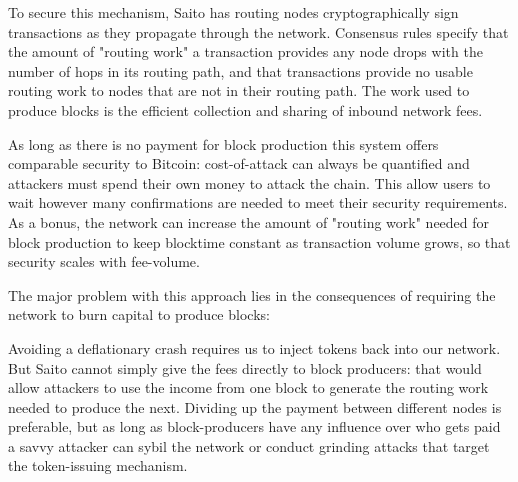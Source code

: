 \documentclass[11pt, oneside]{article}   	%
\begin{document}
\begin{multicols}{2}
To secure this mechanism, Saito has routing nodes cryptographically sign transactions as they propagate through the network. Consensus rules specify that the amount of "routing work" a transaction provides any node drops with the number of hops in its routing path, and that transactions provide no usable routing work to nodes that are not in their routing path. The work used to produce blocks is the efficient collection and sharing of inbound network fees.

As long as there is no payment for block production this system offers comparable security to Bitcoin: cost-of-attack can always be quantified and attackers must spend their own money to attack the chain. This allow users to wait however many confirmations are needed to meet their security requirements. As a bonus, the network can increase the amount of "routing work" needed for block production to keep blocktime constant as transaction volume grows, so that security scales with fee-volume.

The major problem with this approach lies in the consequences of requiring the network to burn capital to produce blocks:


Avoiding a deflationary crash requires us to inject tokens back into our network. But Saito cannot simply give the fees directly to block producers: that would allow attackers to use the income from one block to generate the routing work needed to produce the next. Dividing up the payment between different nodes is preferable, but as long as block-producers have any influence over who gets paid a savvy attacker can sybil the network or conduct grinding attacks that target the token-issuing mechanism.


\end{multicols}
\end{document}
